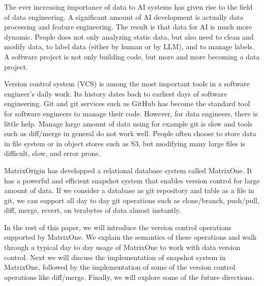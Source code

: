 \documentclass[sigconf,nonacm]{acmart} %
\begin{document}
The ever increasing importance of data to AI systems has given rise to the
field of data engineering.   A significant amount of AI development is actually
data processing and feature engineering.   The result is that data for AI is much 
more dynamic.  People does not only analyzing static data, but also need to clean
and modify data, to label data (either by human or by LLM), and to manage labels.
A software project is not only building code, but more and more becoming a data project.

Version control system (VCS) is among the most important tools in a software 
engineer's daily work.  Its history dates back to earliest days of software
engineering.  Git \cite{Git} and git services such as GitHub has become the standard
tool for software engineers to manage their code.   However, for data engineers,
there is little help.  Manage large amount of data using for example git is slow
and tools such as diff/merge in general do not work well.  People often choose 
to store data in file system or in object stores such as S3, but modifying many 
large files is difficult, slow, and error prone.

MatrixOrigin has developped a relational database system called MatrixOne. 
It has a powerful and efficient snapshot system that enables version control
for large amount of data.  If we consider a database as git repository and 
table as a file in git, we can support all day to day git operations such as
clone/branch, push/pull, diff, merge, revert, on terabytes of data almost 
instantly.

In the rest of this paper, we will introduce the version control operations
supported by MatrixOne.  We explain the semantics of these operations and 
walk through a typical day to day usage of MatrixOne to work with data version 
control.  Next we will discuss the implementation of snapshot system in 
MatrixOne, followed by the implementation of some of the version control 
operations like diff/merge.  Finally, we will explore some of the 
future directions.
\end{document}

